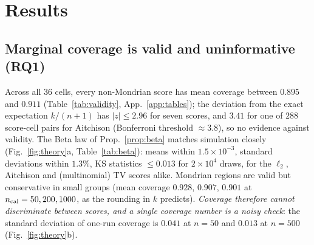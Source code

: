 \documentclass{article}
\theoremstyle{plain}
\theoremstyle{remark}
\begin{document}
\section{Results}
\label{sec:results}
\subsection{Marginal coverage is valid and uninformative (RQ1)}
Across all 36 cells, every non-Mondrian score has mean coverage between $0.895$ and $0.911$ (Table~\ref{tab:validity}, App.~\ref{app:tables}); the deviation from the exact expectation $k/(n+1)$ has $|z|\le2.96$ for seven scores, and $3.41$ for one of $288$ score-cell pairs for Aitchison (Bonferroni threshold $\approx3.8$), so no evidence against validity. The Beta law of Prop.~\ref{prop:beta} matches simulation closely (Fig.~\ref{fig:theory}a, Table~\ref{tab:beta}): means within $1.5\times10^{-3}$, standard deviations within $1.3\%$, KS statistics $\le0.013$ for $2\times10^4$ draws, for the $\ell_2$, Aitchison and (multinomial) TV scores alike. Mondrian regions are valid but conservative in small groups (mean coverage $0.928$, $0.907$, $0.901$ at $n_{\rm cal}=50,200,1000$, as the rounding in $k$ predicts). \emph{Coverage therefore cannot discriminate between scores, and a single coverage number is a noisy check}: the standard deviation of one-run coverage is $0.041$ at $n=50$ and $0.013$ at $n=500$ (Fig.~\ref{fig:theory}b).

\begin{table}[t]
\caption{Synthetic results, $K=5$, $n_{\rm cal}=200$, 200 replicates. \emph{size}: mean pool size (fraction of reference targets inside the region; bold = smallest; 95\% CI half-widths 0.004--0.013), \emph{gap}: worst entropy-tercile coverage deviation $|{\rm cov}-0.9|$ (95\% bootstrap half-width $\le 0.006$). Coverage of every row is within $0.898$--$0.908$ (App.~\ref{app:tables}). $K{=}3,10$ and other $n_{\rm cal}$ in App.~\ref{app:tables}.}
\label{tab:main}
\centering\small

\end{table}
\end{document}
